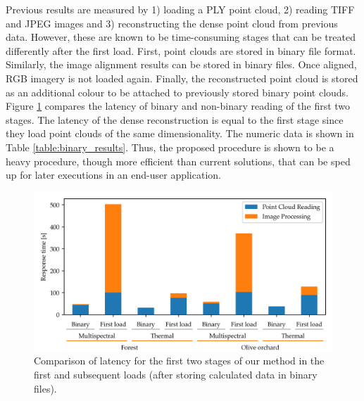 Previous results are measured by 1) loading a PLY point cloud, 2) reading TIFF and JPEG images and 3) reconstructing the dense point cloud from previous data. However, these are known to be time-consuming stages that can be treated differently after the first load. First, point clouds are stored in binary file format. Similarly, the image alignment results can be stored in binary files. Once aligned, RGB imagery is not loaded again. Finally, the reconstructed point cloud is stored as an additional colour to be attached to previously stored binary point clouds. Figure \ref{fig:occlusion_binary_response_time} compares the latency of binary and non-binary reading of the first two stages. The latency of the dense reconstruction is equal to the first stage since they load point clouds of the same dimensionality. The numeric data is shown in Table \ref{table:binary_results}. Thus, the proposed procedure is shown to be a heavy procedure, though more efficient than current solutions, that can be sped up for later executions in an end-user application.

\begin{figure}[ht]
    \centering
    \mbox{} \hfill
    \includegraphics[width=\linewidth]{figs/multi_thermal_projection/results/binary_response_time.png}
    \hspace*{\fill}
    \caption{Comparison of latency for the first two stages of our method in the first and subsequent loads (after storing calculated data in binary files).}
	\label{fig:occlusion_binary_response_time}
\end{figure}

